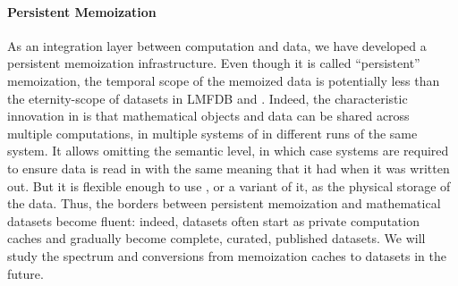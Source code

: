 \paragraph{Persistent Memoization}
As an integration layer between computation and data, we have developed a persistent memoization infrastructure.
Even though it is called ``persistent'' memoization, the temporal scope of the memoized data is potentially less than the eternity-scope of datasets in LMFDB and \dmh.
Indeed, the characteristic innovation in  is that mathematical objects and data can be shared across multiple computations, in multiple systems of in different runs of the same system.
It allows omitting the semantic level, in which case systems are required to ensure data is read in with the same meaning that it had when it was written out.
But it is flexible enough to use \dmh, or a variant of it, as the physical storage of the data.
Thus, the borders between persistent memoization and mathematical datasets become fluent: indeed, datasets often start as private computation caches and gradually become complete, curated, published datasets.
We will study the spectrum and conversions from memoization caches to \dmh datasets in the future. 


